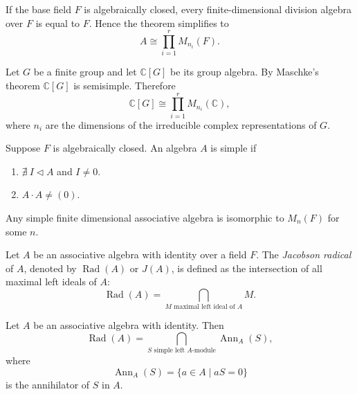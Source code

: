 \begin{remark}
    If the base field $F$ is algebraically closed, every finite-dimensional
    division algebra over $F$ is equal to $F$. Hence the theorem simplifies to
    \[
        A \cong \prod_{i=1}^{r} M_{n_i}(F).
    \]
\end{remark}

\begin{example}
    Let $G$ be a finite group and let $\mathbb{C}[G]$ be its group algebra.
    By Maschke's theorem $\mathbb{C}[G]$ is semisimple. Therefore
    \[
        \mathbb{C}[G] \cong \prod_{i=1}^{r} M_{n_i}(\mathbb{C}),
    \]
    where $n_i$ are the dimensions of the irreducible complex representations
    of $G$.
\end{example}

\begin{definition}
    Suppose $ F $ is algebraically closed. An algebra $ A $ is simple if
    \begin{enumerate}
        \item $ \nexists \  I \triangleleft A $ and $ I \neq 0 $.
        \item $ A\cdot  A \neq (0)$.
    \end{enumerate}
\end{definition}

\begin{corollary}
    Any simple finite dimensional associative algebra is isomorphic to $ M_n(F) $ for some $ n $.
\end{corollary}

\begin{definition}
    Let $A$ be an associative algebra with identity over a field $F$.
    The \emph{Jacobson radical} of $A$, denoted by $\operatorname{Rad}(A)$
    or $J(A)$, is defined as the intersection of all maximal left ideals of $A$:
    \[
        \operatorname{Rad}(A)
        =
        \bigcap_{M \text{ maximal left ideal of } A} M.
    \]
\end{definition}


\begin{proposition}
    Let $A$ be an associative algebra with identity. Then
    \[
        \operatorname{Rad}(A)
        =
        \bigcap_{S \text{ simple left } A\text{-module}}
        \operatorname{Ann}_A(S),
    \]
    where
    \[
        \operatorname{Ann}_A(S)
        =
        \{a\in A \mid aS=0\}
    \]
    is the annihilator of $S$ in $A$.
\end{proposition}


